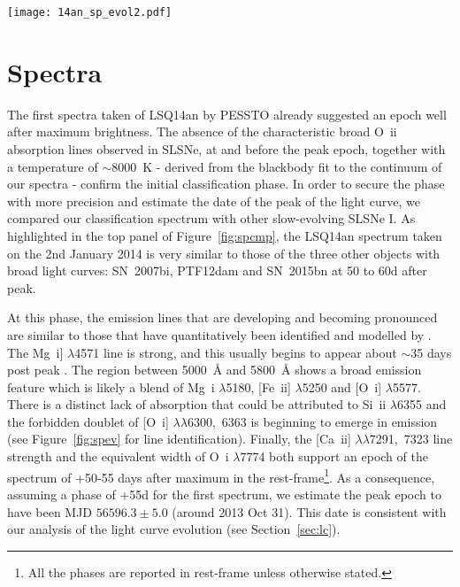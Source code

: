 \documentclass[useAMS,usenatbib]{mn2e}
\def\an{LSQ14an}
\begin{document}
\begin{figure*}
\texttt{[image: 14an\_sp\_evol2.pdf]}
\caption{Spectral evolution of \an. The phase of each spectra is relative to the assumed peak epoch. The $\oplus$ symbol marks the positions of the strongest telluric absorptions. The most prominent features are labelled, together with the position (dashed magenta line) of the NIR Ca~{\sc ii}, which is not observed.}
\label{fig:spev}
\end{figure*}

\section{Spectra}\label{sec:sp}
The first spectra taken of \an\/ by PESSTO \citep{atel} already suggested an 
epoch well after maximum brightness.  The absence of the characteristic broad  O~{\sc ii}
absorption lines observed in SLSNe, at and before the peak epoch, together with a temperature of $\sim$8000~K - derived from the blackbody fit to the continuum of our spectra - confirm the initial classification phase. In order to secure the phase with more precision and estimate the date of the peak of the light curve, we compared our classification spectrum with other slow-evolving SLSNe I. As highlighted in the top panel of Figure~\ref{fig:spcmp}, the  \an\/ spectrum taken on the 2nd January 2014 is very similar to those of the three other objects with broad light curves: SN~2007bi, PTF12dam and SN~2015bn at 50 to 60d after peak. 

At this phase, the emission lines that are developing and becoming pronounced are 
similar to those that have quantitatively been identified and modelled by \cite{je16}. 
The Mg~{\sc i}] $\lambda$4571 line is strong, and this usually begins to appear about $\sim$35 days post peak \citep[][]{in13, ni16a}. 
The region between 5000~\AA\/ and 5800~\AA\/ shows a broad emission feature
which is likely a blend of
Mg~{\sc i} $\lambda$5180, 
[Fe~{\sc ii}] $\lambda$5250 and 
[O~{\sc i}] $\lambda$5577.  
There is a distinct lack of absorption that could be attributed to 
Si~{\sc ii} $\lambda$6355 and the forbidden doublet of [O~{\sc i}] $\lambda\lambda$6300,~6363 is beginning to emerge in emission (see  Figure~\ref{fig:spev} for line identification).  Finally, the [Ca~{\sc ii}] $\lambda\lambda$7291,~7323 line strength and the equivalent width of O~{\sc i} $\lambda$7774 both support an epoch of the spectrum of 
 +50-55 days after maximum in the rest-frame\footnote{All the phases are reported in rest-frame unless otherwise stated.}. As a consequence, assuming a phase of +55d for the first spectrum, we estimate the peak epoch to have been MJD $56596.3\pm5.0$  (around 2013 Oct 31). This date is consistent with 
our analysis of  the light curve evolution (see Section~\ref{sec:lc}).
\end{document}
